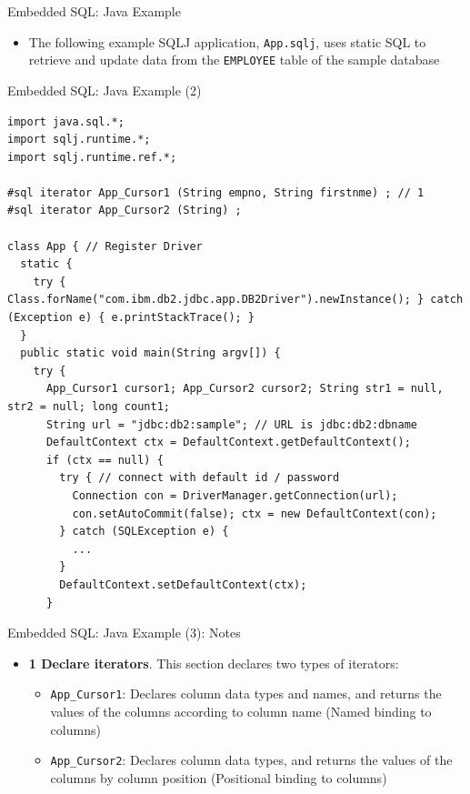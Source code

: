 \documentclass[aspectratio=169, xcolor=dvipsnames]{beamer}
\begin{document}
\begin{frame}{Embedded SQL: Java Example}
    \begin{itemize}[<+->]
        \item The following example SQLJ application, \texttt{App.sqlj}, uses static SQL to retrieve and update data from the \texttt{EMPLOYEE} table of the sample database
    \end{itemize}
\end{frame}

\begin{frame}[fragile]{Embedded SQL: Java Example (2)}
    \begin{verbatim}
import java.sql.*;
import sqlj.runtime.*;
import sqlj.runtime.ref.*;

#sql iterator App_Cursor1 (String empno, String firstnme) ; // 1
#sql iterator App_Cursor2 (String) ;

class App { // Register Driver
  static {
    try { Class.forName("com.ibm.db2.jdbc.app.DB2Driver").newInstance(); } catch (Exception e) { e.printStackTrace(); }
  }
  public static void main(String argv[]) {
    try {
      App_Cursor1 cursor1; App_Cursor2 cursor2; String str1 = null, str2 = null; long count1;
      String url = "jdbc:db2:sample"; // URL is jdbc:db2:dbname
      DefaultContext ctx = DefaultContext.getDefaultContext();
      if (ctx == null) {
        try { // connect with default id / password
          Connection con = DriverManager.getConnection(url);
          con.setAutoCommit(false); ctx = new DefaultContext(con);
        } catch (SQLException e) {
          ...
        }
        DefaultContext.setDefaultContext(ctx);
      }
    \end{verbatim}
\end{frame}

\begin{frame}{Embedded SQL: Java Example (3): Notes}
    \begin{itemize}
        \item \textbf{1 Declare iterators}. This section declares two types of iterators:
        \begin{itemize}
            \item \texttt{App\_Cursor1}: Declares column data types and names, and returns the values of the columns according to column name (Named binding to columns)
            \item \texttt{App\_Cursor2}: Declares column data types, and returns the values of the columns by column position (Positional binding to columns)
        \end{itemize}
    \end{itemize}
\end{frame}
\end{document}
